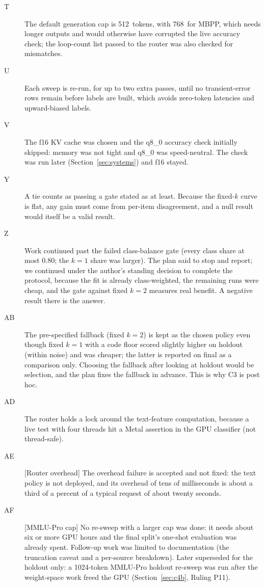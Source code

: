 \documentclass[11pt]{article}
\newcommand{\CapText}{512}
\newcommand{\CapCode}{768}
\newcommand{\GateClass}{0.80}
\begin{document}
\begin{description}
\item[T] The default generation cap is \CapText\ tokens, with \CapCode\ for MBPP, which needs longer outputs and would otherwise have corrupted the live accuracy check; the loop-count list passed to the router was also checked for mismatches.
\item[U] Each sweep is re-run, for up to two extra passes, until no transient-error rows remain before labels are built, which avoids zero-token latencies and upward-biased labels.
\item[V] The f16 KV cache was chosen and the q8\_0 accuracy check initially skipped: memory was not tight and q8\_0 was speed-neutral. The check was run later (Section~\ref{sec:systems}) and f16 stayed.
\item[Y] A tie counts as passing a gate stated as at least. Because the fixed-$k$ curve is flat, any gain must come from per-item disagreement, and a null result would itself be a valid result.
\item[Z] Work continued past the failed class-balance gate (every class share at most \GateClass; the $k{=}1$ share was larger). The plan said to stop and report; we continued under the author's standing decision to complete the protocol, because the fit is already class-weighted, the remaining runs were cheap, and the gate against fixed $k{=}2$ measures real benefit. A negative result there is the answer.
\item[AB] The pre-specified fallback (fixed $k{=}2$) is kept as the chosen policy even though fixed $k{=}1$ with a code floor scored slightly higher on holdout (within noise) and was cheaper; the latter is reported on final as a comparison only. Choosing the fallback after looking at holdout would be selection, and the plan fixes the fallback in advance. This is why C3 is post hoc.
\item[AD] The router holds a lock around the text-feature computation, because a live test with four threads hit a Metal assertion in the GPU classifier (not thread-safe).
\item[AE] [Router overhead] The overhead failure is accepted and not fixed: the text policy is not deployed, and its overhead of tens of milliseconds is about a third of a percent of a typical request of about twenty seconds.
\item[AF] [MMLU-Pro cap] No re-sweep with a larger cap was done: it needs about six or more GPU hours and the final split's one-shot evaluation was already spent. Follow-up work was limited to documentation (the truncation caveat and a per-source breakdown). Later superseded for the holdout only: a 1024-token MMLU-Pro holdout re-sweep was run after the weight-space work freed the GPU (Section~\ref{sec:c4b}, Ruling P11).

\end{description}
\end{document}
